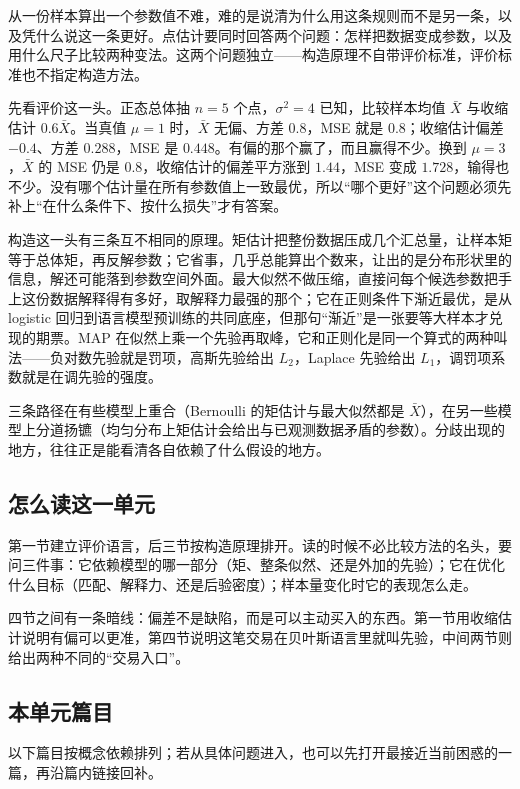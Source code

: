 从一份样本算出一个参数值不难，难的是说清为什么用这条规则而不是另一条，以及凭什么说这一条更好。点估计要同时回答两个问题：怎样把数据变成参数，以及用什么尺子比较两种变法。这两个问题独立——构造原理不自带评价标准，评价标准也不指定构造方法。

先看评价这一头。正态总体抽 \(n=5\) 个点，\(\sigma^2=4\) 已知，比较样本均值 \(\bar X\) 与收缩估计 \(0.6\bar X\)。当真值 \(\mu=1\) 时，\(\bar X\) 无偏、方差 \(0.8\)，MSE 就是 \(0.8\)；收缩估计偏差 \(-0.4\)、方差 \(0.288\)，MSE 是 \(0.448\)。有偏的那个赢了，而且赢得不少。换到 \(\mu=3\)，\(\bar X\) 的 MSE 仍是 \(0.8\)，收缩估计的偏差平方涨到 \(1.44\)，MSE 变成 \(1.728\)，输得也不少。没有哪个估计量在所有参数值上一致最优，所以``哪个更好''这个问题必须先补上``在什么条件下、按什么损失''才有答案。

构造这一头有三条互不相同的原理。矩估计把整份数据压成几个汇总量，让样本矩等于总体矩，再反解参数；它省事，几乎总能算出个数来，让出的是分布形状里的信息，解还可能落到参数空间外面。最大似然不做压缩，直接问每个候选参数把手上这份数据解释得有多好，取解释力最强的那个；它在正则条件下渐近最优，是从 logistic 回归到语言模型预训练的共同底座，但那句``渐近''是一张要等大样本才兑现的期票。MAP 在似然上乘一个先验再取峰，它和正则化是同一个算式的两种叫法——负对数先验就是罚项，高斯先验给出 \(L_2\)，Laplace 先验给出 \(L_1\)，调罚项系数就是在调先验的强度。

三条路径在有些模型上重合（Bernoulli 的矩估计与最大似然都是 \(\bar X\)），在另一些模型上分道扬镳（均匀分布上矩估计会给出与已观测数据矛盾的参数）。分歧出现的地方，往往正是能看清各自依赖了什么假设的地方。

\subsection{怎么读这一单元}

第一节建立评价语言，后三节按构造原理排开。读的时候不必比较方法的名头，要问三件事：它依赖模型的哪一部分（矩、整条似然、还是外加的先验）；它在优化什么目标（匹配、解释力、还是后验密度）；样本量变化时它的表现怎么走。

四节之间有一条暗线：偏差不是缺陷，而是可以主动买入的东西。第一节用收缩估计说明有偏可以更准，第四节说明这笔交易在贝叶斯语言里就叫先验，中间两节则给出两种不同的``交易入口''。

\subsection{本单元篇目}

以下篇目按概念依赖排列；若从具体问题进入，也可以先打开最接近当前困惑的一篇，再沿篇内链接回补。

